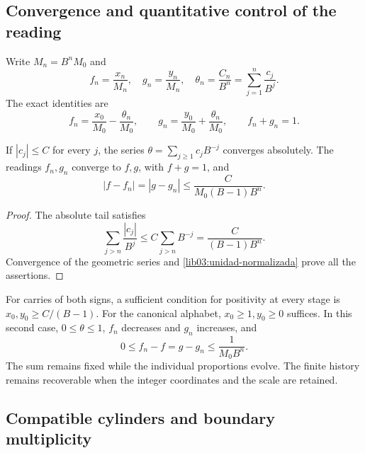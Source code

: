 \subsection{Convergence and quantitative control of the reading}
\label{lib03:limite}

Write \(M_n=B^nM_0\) and
\begin{equation}
 f_n=\frac{x_n}{M_n},\quad g_n=\frac{y_n}{M_n},\quad
 \theta_n=\frac{C_n}{B^n}=\sum_{j=1}^n\frac{c_j}{B^j}.
 \label{lib03:lecturas-normalizadas}
\end{equation}
The exact identities are
\begin{equation}
 f_n=\frac{x_0}{M_0}-\frac{\theta_n}{M_0},\qquad
 g_n=\frac{y_0}{M_0}+\frac{\theta_n}{M_0},\qquad f_n+g_n=1.
 \label{lib03:unidad-normalizada}
\end{equation}

\begin{theorem}
\label{lib03:teo-limite}
If \(|c_j|\leq C\) for every \(j\), the series
\(\theta=\sum_{j\geq1}c_jB^{-j}\) converges absolutely. The
readings \(f_n,g_n\) converge to \(f,g\), with \(f+g=1\), and
\begin{equation}
 |f-f_n|=|g-g_n|\leq\frac{C}{M_0(B-1)B^n}.
 \label{lib03:cota-cola}
\end{equation}
\end{theorem}

\begin{proof}
The absolute tail satisfies
\[
 \sum_{j>n}\frac{|c_j|}{B^j}
 \leq C\sum_{j>n}B^{-j}=\frac{C}{(B-1)B^n}.
\]
Convergence of the geometric series and
\eqref{lib03:unidad-normalizada} prove all the assertions.
\end{proof}

For carries of both signs, a sufficient condition for positivity
at every stage is \(x_0,y_0\geq C/(B-1)\). For the canonical
alphabet, \(x_0\geq1,y_0\geq0\) suffices. In this second case,
\(0\leq\theta\leq1\), \(f_n\) decreases and \(g_n\) increases, and
\begin{equation}
 0\leq f_n-f=g-g_n\leq\frac1{M_0B^n}.
 \label{lib03:cota-canonica}
\end{equation}
The sum remains fixed while the individual proportions evolve.
The finite history remains recoverable when the integer
coordinates and the scale are retained.

\subsection{Compatible cylinders and boundary multiplicity}
\label{lib03:cilindros}

